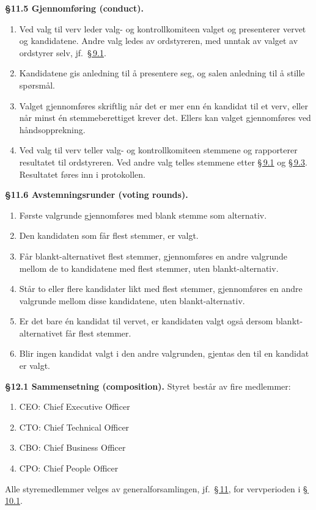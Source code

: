 \documentclass{../../../Common/Latex/Templates/rapport}
\begin{document}
\textbf{\S 11.5 Gjennomføring (conduct).}\label{nbylaw:11.5}
\begin{enumerate}
  \item Ved valg til verv leder valg- og kontrollkomiteen valget og presenterer vervet og kandidatene. Andre valg ledes av ordstyreren, med unntak av valget av ordstyrer selv, jf.\ \hyperref[nbylaw:9.1]{\S\,9.1}.
  \item Kandidatene gis anledning til \r{a} presentere seg, og salen anledning til \r{a} stille spørsm\r{a}l.
  \item Valget gjennomføres skriftlig n\r{a}r det er mer enn \'en kandidat til et verv, eller n\r{a}r minst \'en stemmeberettiget krever det. Ellers kan valget gjennomføres ved h\r{a}ndsopprekning.
  \item Ved valg til verv teller valg- og kontrollkomiteen stemmene og rapporterer resultatet til ordstyreren. Ved andre valg telles stemmene etter \hyperref[nbylaw:9.1]{\S\,9.1} og \hyperref[nbylaw:9.3]{\S\,9.3}. Resultatet føres inn i protokollen.
\end{enumerate}

\textbf{\S 11.6 Avstemningsrunder (voting rounds).}\label{nbylaw:11.6}
\begin{enumerate}
  \item Første valgrunde gjennomføres med blank stemme som alternativ.
  \item Den kandidaten som f\r{a}r flest stemmer, er valgt.
  \item F\r{a}r blankt-alternativet flest stemmer, gjennomføres en andre valgrunde mellom de to kandidatene med flest stemmer, uten blankt-alternativ.
  \item St\r{a}r to eller flere kandidater likt med flest stemmer, gjennomføres en andre valgrunde mellom disse kandidatene, uten blankt-alternativ.
  \item Er det bare \'en kandidat til vervet, er kandidaten valgt ogs\r{a} dersom blankt-alternativet f\r{a}r flest stemmer.
  \item Blir ingen kandidat valgt i den andre valgrunden, gjentas den til en kandidat er valgt.
\end{enumerate}

\label{nbylaw:12}
\textbf{\S 12.1 Sammensetning (composition).}\label{nbylaw:12.1} Styret best\r{a}r av fire medlemmer:
\begin{enumerate}
  \item CEO: Chief Executive Officer
  \item CTO: Chief Technical Officer
  \item CBO: Chief Business Officer
  \item CPO: Chief People Officer
\end{enumerate}
Alle styremedlemmer velges av generalforsamlingen, jf.\ \hyperref[nbylaw:11]{\S\,11}, for vervperioden i \hyperref[nbylaw:10.1]{\S\,10.1}.
\end{document}
